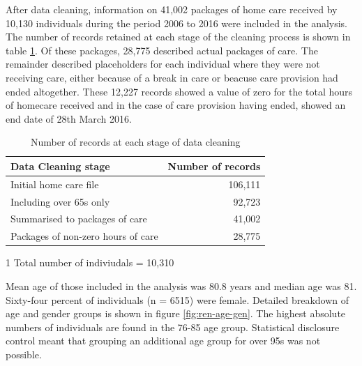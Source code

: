 \documentclass[]{article}
\begin{document}
After data cleaning, information on 41,002 packages of home care
received by 10,130 individuals during the period 2006 to 2016 were
included in the analysis. The number of records retained at each stage
of the cleaning process is shown in table \ref{tab:renf-cleaning}. Of
these packages, 28,775 described actual packages of care. The remainder
described placeholders for each individual where they were not receiving
care, either because of a break in care or beacuse care provision had
ended altogether. These 12,227 records showed a value of zero for the
total hours of homecare received and in the case of care provision
having ended, showed an end date of 28th March 2016.

\begin{table}[h]
\centering
\caption{Number of records at each stage of data cleaning}
\label{tab:renf-cleaning}
\begin{threeparttable}
\begin{tabular}{@{}lr@{}}
\toprule
Data Cleaning stage                & Number of records \\ \midrule
Initial home care file             & 106,111           \\
Including over 65s only            & 92,723             \\
Summarised to packages of care     & 41,002\tnote{1}    \\ 
Packages of non-zero hours of care & 28,775             \\ \bottomrule
\end{tabular}
\begin{tablenotes}
\item[1] Total number of indiviudals = 10,310
\end{tablenotes}
\end{threeparttable}
\end{table}

Mean age of those included in the analysis was 80.8 years and median age
was 81. Sixty-four percent of individuals (n = 6515) were female.
Detailed breakdown of age and gender groups is shown in figure
\ref{fig:ren-age-gen}. The highest absolute numbers of individuals are
found in the 76-85 age group. Statistical disclosure control meant that
grouping an additional age group for over 95s was not possible.
\end{document}
